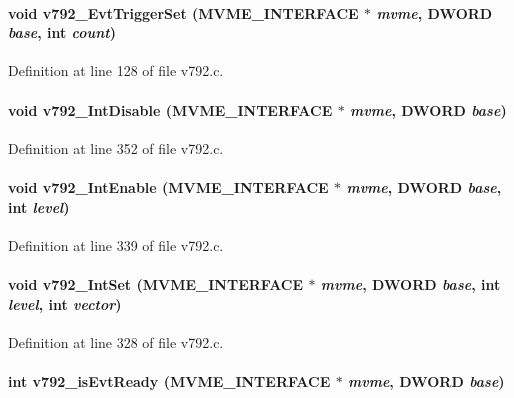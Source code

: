 \paragraph[{v792\_\-EvtTriggerSet}]{\setlength{\rightskip}{0pt plus 5cm}void v792\_\-EvtTriggerSet ({\bf MVME\_\-INTERFACE} $\ast$ {\em mvme}, \/  {\bf DWORD} {\em base}, \/  int {\em count})}\hfill\label{v792_8h_a3b2bc7ff2f4b4ab41dbe834eba5516f1}


Definition at line 128 of file v792.c.
\paragraph[{v792\_\-IntDisable}]{\setlength{\rightskip}{0pt plus 5cm}void v792\_\-IntDisable ({\bf MVME\_\-INTERFACE} $\ast$ {\em mvme}, \/  {\bf DWORD} {\em base})}\hfill\label{v792_8h_a2ef8260ef4fe27e40837801320ffc617}


Definition at line 352 of file v792.c.
\paragraph[{v792\_\-IntEnable}]{\setlength{\rightskip}{0pt plus 5cm}void v792\_\-IntEnable ({\bf MVME\_\-INTERFACE} $\ast$ {\em mvme}, \/  {\bf DWORD} {\em base}, \/  int {\em level})}\hfill\label{v792_8h_adae02a9413e4b151f9ef8cc527e9d692}


Definition at line 339 of file v792.c.
\paragraph[{v792\_\-IntSet}]{\setlength{\rightskip}{0pt plus 5cm}void v792\_\-IntSet ({\bf MVME\_\-INTERFACE} $\ast$ {\em mvme}, \/  {\bf DWORD} {\em base}, \/  int {\em level}, \/  int {\em vector})}\hfill\label{v792_8h_ae704f9e359d9504f3623e75f836163b6}


Definition at line 328 of file v792.c.
\paragraph[{v792\_\-isEvtReady}]{\setlength{\rightskip}{0pt plus 5cm}int v792\_\-isEvtReady ({\bf MVME\_\-INTERFACE} $\ast$ {\em mvme}, \/  {\bf DWORD} {\em base})}\hfill\label{v792_8h_a9cf758eade2bf73135ddb04beaebe579}


